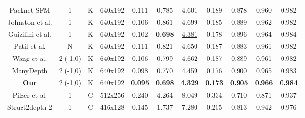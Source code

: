 \documentclass[journal]{IEEEtran}
\begin{document}
\begin{table*}
\begin{tabular}{ccccccccccc}
Packnet-SFM \cite{guizilini20203d}                & 1                            & K                        & 640x192              & 0.111   & 0.785  & 4.601  & 0.189   & 0.878           & 0.960             & 0.982             \\
Johnston et al. \cite{johnston2020self}           & 1                            & K                        & 640x192              & 0.106   & 0.861  & 4.699  & 0.185   & 0.889           & 0.962             & 0.982             \\
Guizilini et al. \cite{guizilini2020semantically} & 1                            & K                        & 640x192              & 0.102   & \textbf{0.698}  & \underline{4.381}  & 0.178   & 0.896           & 0.964             & 0.984             \\
Patil et al. \cite{patil2020don}                  & N                            & K                        & 640x192              & 0.111   & 0.821  & 4.650  & 0.187   & 0.883           & 0.961             & 0.982             \\
Wang et al. \cite{wang2020self}                   & 2 (-1,0)                     & K                        & 640x192              & 0.106   & 0.799  & 4.662  & 0.187   & 0.889           & 0.961             & 0.982             \\
ManyDepth \cite{manydepth}                        & 2 (-1,0)                     & K                        & 640x192              & \underline{0.098}   & \underline{0.770}  & 4.459  & \underline{0.176}   & \underline{0.900}          & \underline{0.965}             & \underline{0.983}             \\
\textbf{Our}                                                                & 2 (-1,0)                     & K                        & 640x192              & \textbf{0.095}   & \textbf{0.698}  & \textbf{4.329}  & \textbf{0.173}   & \textbf{0.905}           & \textbf{0.966}             & \textbf{0.984}             \\ \hline
Pilzer et al. \cite{pilzer2018unsupervised}       & 1                            & C                        & 512x256              & 0.240   & 4.264  & 8.049  & 0.334   & 0.710           & 0.871             & 0.937             \\
Struct2depth 2 \cite{casser2019}                  & 1                            & C                        & 416x128              & 0.145   & 1.737  & 7.280  & 0.205   & 0.813           & 0.942             & 0.976             \\

\end{tabular}
\end{table*}
\end{document}
